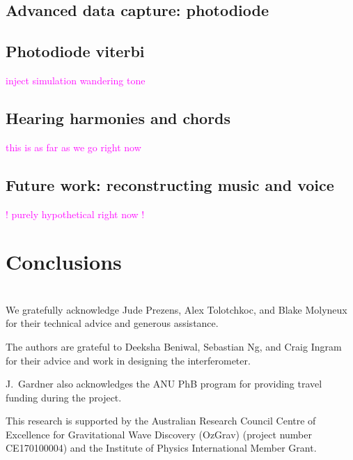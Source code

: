 \documentclass[prb,preprint]{revtex4-1}
\newcommand{\jam}{\textcolor{magenta}}
\begin{document}
\subsection{Advanced data capture: photodiode}

\subsection{Photodiode viterbi}
\jam{inject simulation wandering tone}


\subsection{Hearing harmonies and chords}
\jam{this is as far as we go right now}

\subsection{Future work: reconstructing music and voice}
\jam{! purely hypothetical right now !}


\section{Conclusions}


\appendix
\section{}


\begin{acknowledgments}
We gratefully acknowledge Jude Prezens, Alex Tolotchkoc, and Blake Molyneux for their technical advice and generous assistance.

The authors are grateful to Deeksha Beniwal, Sebastian Ng, and Craig Ingram for their advice and work in designing the interferometer. 

J.~Gardner also acknowledges the ANU PhB program for providing travel funding during the project.

This research is supported by the Australian Research Council Centre of Excellence for Gravitational Wave Discovery (OzGrav) (project number CE170100004) and the Institute of Physics International Member Grant.


\end{acknowledgments}




\end{document}
